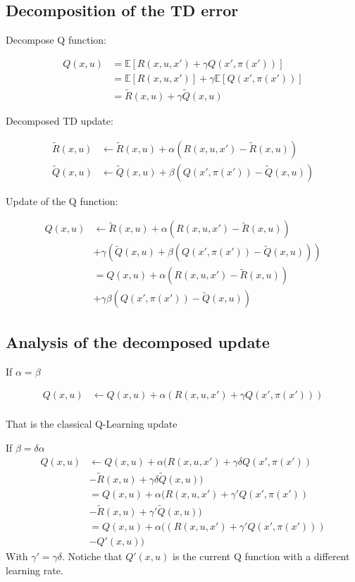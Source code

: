 \documentclass[conference]{IEEEtran}
\begin{document}
\subsection{Decomposition of the TD error}

Decompose Q function:

\begin{align}
Q(x,u) & =\mathbb{E}\left[R(x,u,x')+\gamma Q(x',\pi(x'))\right] \nonumber\\ 
 & =\mathbb{E}\left[R(x,u,x')\right]+\gamma\mathbb{E}\left[Q(x',\pi(x'))\right] \nonumber\\
 & =\tilde{R}(x,u)+\gamma\tilde{Q}(x,u)
\end{align}

Decomposed TD update:

\begin{align}
\tilde{R}(x,u) & \leftarrow\tilde{R}(x,u)+\alpha(R(x,u,x')-\tilde{R}(x,u))\\
\tilde{Q}(x,u) & \leftarrow\tilde{Q}(x,u)+\beta(Q(x',\pi(x'))-\tilde{Q}(x,u))
\end{align}

Update of the Q function:

\begin{align}
Q(x,u) & \leftarrow\tilde{R}(x,u)+\alpha(R(x,u,x')-\tilde{R}(x,u)) \nonumber\\
 & +\gamma\left(\tilde{Q}(x,u)+\beta(Q(x',\pi(x'))-\tilde{Q}(x,u))\right) \nonumber\\
 & =Q(x,u)+\alpha(R(x,u,x')-\tilde{R}(x,u)) \nonumber\\
 & +\gamma\beta(Q(x',\pi(x'))-\tilde{Q}(x,u))
\end{align}

\subsection{Analysis of the decomposed update}
If $\alpha=\beta$

\begin{align}
Q(x,u) & \leftarrow Q(x,u)+\alpha(R(x,u,x')+\gamma Q(x',\pi(x')))\\
\end{align}

That is the classical Q-Learning update

If $\beta=\delta\alpha$
\begin{align}
Q(x,u) & \leftarrow Q(x,u)+\alpha(R(x,u,x')+\gamma\delta Q(x',\pi(x')) \nonumber\\
 & -\tilde{R}(x,u)+\gamma\delta\tilde{Q}(x,u)) \nonumber\\
 & =Q(x,u)+\alpha(R(x,u,x')+\gamma'Q(x',\pi(x')) \nonumber\\
 & -\tilde{R}(x,u)+\gamma'\tilde{Q}(x,u)) \nonumber\\
 & =Q(x,u)+\alpha((R(x,u,x')+\gamma'Q(x',\pi(x'))) \nonumber\\
 & -Q'(x,u))
\end{align}
With $\gamma'=\gamma\delta$. Notiche that $Q'(x,u)$ is the current Q function with a different learning rate.
\end{document}

